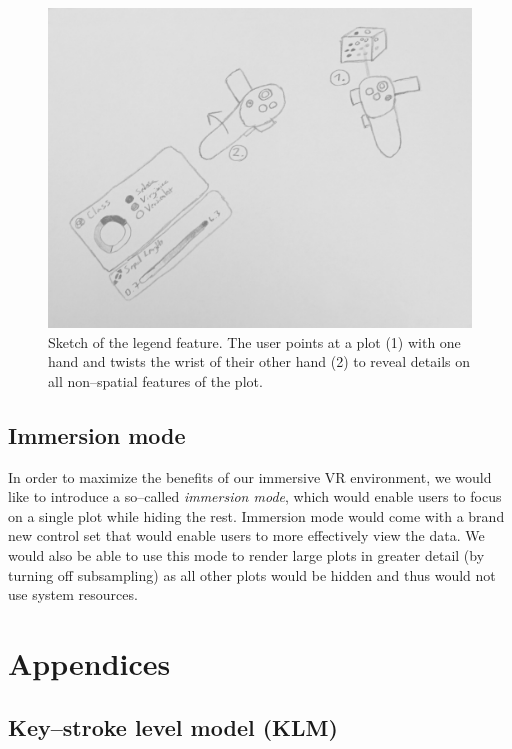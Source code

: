 \documentclass{article}
\begin{document}
\begin{figure}[!h]
\centering
\includegraphics[scale=1.2]{images/legend}
\caption{Sketch of the legend feature. The user points at a plot (1) with one hand and twists the wrist of their other hand (2) to reveal details on all non--spatial features of the plot.}
\label{fig:legend}
\end{figure}

\subsection{Immersion mode}

In order to maximize the benefits of our immersive VR environment, we would like to introduce a so--called \emph{immersion mode}, which would enable users to focus on a single plot while hiding the rest. Immersion mode would come with a brand new control set that would enable users to more effectively view the data. We would also be able to use this mode to render large plots in greater detail (by turning off subsampling) as all other plots would be hidden and thus would not use system resources.

\section{Appendices}

\subsection{Key--stroke level model (KLM)}
\end{document}
